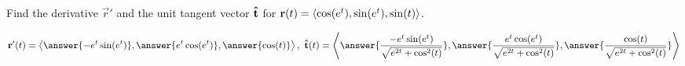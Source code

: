 \documentclass{ximera}
\author{David Guichard \and Neal Koblitz \and H. Jerome Keisler \and Albert Scheller \and Barry Balof \and Mike Wills \and Matthew Carr}
\begin{document}
\begin{exercise}



Find the derivative $\vec{r}'$ and the unit tangent vector $\mathbf{\hat{t}}$ for $\mathbf{r}(t)=\left\langle \cos(e^t),\sin(e^t),\sin(t)\right\rangle$.

\begin{prompt}
\[
\vec{r}'(t)=\vector{\answer{-e^{t}\sin(e^t)},\answer{e^{t}\cos(e^t)},\answer{\cos(t)}},\ \utan(t)=\vector{\answer{\frac{-e^{t}\sin(e^{t})}{\sqrt{e^{2t}+\cos^{2}(t)}}},\answer{\frac{e^{t}\cos(e^{t})}{\sqrt{e^{2t}+\cos^{2}(t)}}},\answer{\frac{\cos(t)}{\sqrt{e^{2t}+\cos^{2}(t)}}}}
\]
\end{prompt}


\end{exercise}
\end{document}
